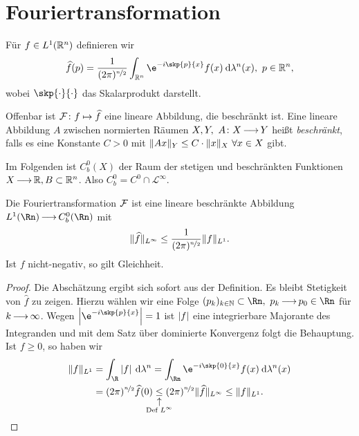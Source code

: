 \documentclass[skript.tex]{subfiles}
\begin{document}
\chapter{Fouriertransformation}
\setcounter{cntr}{0}
\begin{defin}[Fouriertransformation]
	Für $f \in L^1(\mathbb{R}^n)$ definieren wir
	\[
		\widehat{f}(p) = \frac{1}{(2\pi)^{\nicefrac{n}{2}}} \int_{\mbb{R}^n} \e^{-i \skp{p}{x}} f(x) \md \lambda^n(x),\ p\in \mbb{R}^n,
	\]
	wobei $\skp{\cdot}{\cdot}$ das Skalarprodukt darstellt.
\end{defin}
Offenbar ist $\mathcal{F}\colon f \mapsto \widehat{f}$ eine lineare Abbildung, die beschränkt ist. Eine lineare Abbildung $A$ zwischen normierten Räumen $X,Y,\ A\colon X \kern -1pt \longrightarrow \kern -1pt Y$ heißt \textit{beschränkt}, falls es eine Konstante $C>0$ mit $\norm{Ax}_Y \leq C\cdot \norm{x}_X\ \forall x \in X$ gibt. 

Im Folgenden ist $C^0_b(X)$ der Raum der stetigen und beschränkten Funktionen $X\kern -1pt \longrightarrow \kern -1pt \mathbb{R}, B \subset \mathbb{R}^n$. Also $C^0_b = C^0 \cap \mathscr{L}^\infty$.

\begin{lem}
	Die Fouriertransformation $\mathcal{F}$ ist eine lineare beschränkte Abbildung $L^1(\Rn)  \lra C^0_b(\Rn)$ mit
	\[
		\lVert \widehat{f} \rVert_{L^\infty} \leq \frac{1}{(2\pi)^{\nicefrac{n}{2}}} \lVert f \rVert_{L^1}.
	\] 
	Ist $f$ nicht-negativ, so gilt Gleichheit. %
\end{lem}

\begin{proof}
	Die Abschätzung ergibt sich sofort aus der Definition. Es bleibt Stetigkeit von $\widehat{f}$ zu zeigen. Hierzu wählen wir eine Folge $(p_k)_{k\in\N} \sbs \Rn,\ p_k \lra p_0 \in \Rn$ für $k\kern -1pt \longrightarrow \kern -1pt\infty$. Wegen $\abs{\e^{-i \skp{p}{x}}}=1$ ist $\left| f \right|$ eine integrierbare Majorante des Integranden und mit dem Satz über dominierte Konvergenz folgt die Behauptung. Ist $f\geq0$, so haben wir 
	\begin{align*}
		\norm{f}_{L^1} &= \int_\R \abs{f} \md \lambda^n = \int_{\Rn} \e^{-i \skp{0}{x}} f(x) \md \lambda^n(x)\\
		&= (2\pi)^{\nicefrac{n}{2}} \widehat{f}(0) \uarrow{\text{Def }L^\infty}{\leq} (2\pi)^{\nicefrac{n}{2}} \norm{\widehat{f}}_{L^\infty} \leq \norm{f}_{L^1}.
	\end{align*}
\end{proof}
\end{document}
